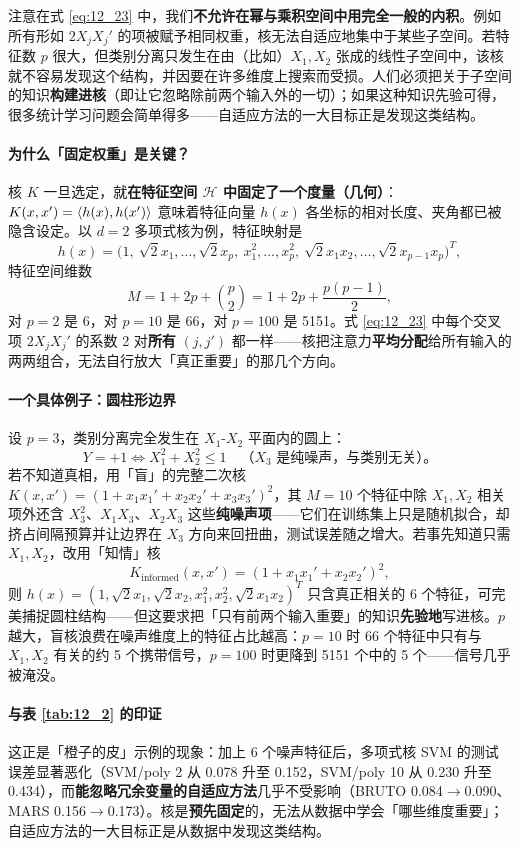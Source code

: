 \begin{remark}[核不能自适应地集中于子空间]
注意在式 \ref{eq:12_23} 中，我们\textbf{不允许在幂与乘积空间中用完全一般的内积}。例如所有形如 $2X_j X_j'$ 的项被赋予相同权重，核无法自适应地集中于某些子空间。若特征数 $p$ 很大，但类别分离只发生在由（比如）$X_1,X_2$ 张成的线性子空间中，该核就不容易发现这个结构，并因要在许多维度上搜索而受损。人们必须把关于子空间的知识\textbf{构建进核}（即让它忽略除前两个输入外的一切）；如果这种知识先验可得，很多统计学习问题会简单得多——自适应方法的一大目标正是发现这类结构。

\paragraph{为什么「固定权重」是关键？}

核 $K$ 一旦选定，就\textbf{在特征空间 $\mathcal{H}$ 中固定了一个度量（几何）}：$K(x,x')=\langle h(x),h(x')\rangle$ 意味着特征向量 $h(x)$ 各坐标的相对长度、夹角都已被隐含设定。以 $d=2$ 多项式核为例，特征映射是
\[
h(x) = \bigl(1,\ \sqrt{2}x_1,\dots,\sqrt{2}x_p,\ x_1^2,\dots,x_p^2,\ \sqrt{2}x_1x_2,\dots,\sqrt{2}x_{p-1}x_p\bigr)^T,
\]
特征空间维数
\[
M = 1 + 2p + \binom{p}{2} = 1 + 2p + \frac{p(p-1)}{2},
\]
对 $p=2$ 是 6，对 $p=10$ 是 66，对 $p=100$ 是 5151。式 \ref{eq:12_23} 中每个交叉项 $2X_j X_j'$ 的系数 2 对\textbf{所有} $(j,j')$ 都一样——核把注意力\textbf{平均分配}给所有输入的两两组合，无法自行放大「真正重要」的那几个方向。

\paragraph{一个具体例子：圆柱形边界}

设 $p=3$，类别分离完全发生在 $X_1$-$X_2$ 平面内的圆上：
\[
Y=+1 \iff X_1^2 + X_2^2 \le 1 \quad\text{（$X_3$ 是纯噪声，与类别无关）。}
\]
若不知道真相，用「盲」的完整二次核 $K(x,x')=(1+x_1x_1'+x_2x_2'+x_3x_3')^2$，其 $M=10$ 个特征中除 $X_1,X_2$ 相关项外还含 $X_3^2$、$X_1X_3$、$X_2X_3$ 这些\textbf{纯噪声项}——它们在训练集上只是随机拟合，却挤占间隔预算并让边界在 $X_3$ 方向来回扭曲，测试误差随之增大。若事先知道只需 $X_1,X_2$，改用「知情」核
\[
K_{\text{informed}}(x,x') = (1 + x_1x_1' + x_2x_2')^2,
\]
则 $h(x)=(1,\sqrt{2}x_1,\sqrt{2}x_2,x_1^2,x_2^2,\sqrt{2}x_1x_2)^T$ 只含真正相关的 6 个特征，可完美捕捉圆柱结构——但这要求把「只有前两个输入重要」的知识\textbf{先验地}写进核。$p$ 越大，盲核浪费在噪声维度上的特征占比越高：$p=10$ 时 66 个特征中只有与 $X_1,X_2$ 有关的约 5 个携带信号，$p=100$ 时更降到 5151 个中的 5 个——信号几乎被淹没。

\paragraph{与表 \ref{tab:12_2} 的印证}

这正是「橙子的皮」示例的现象：加上 6 个噪声特征后，多项式核 SVM 的测试误差显著恶化（SVM/poly 2 从 0.078 升至 0.152，SVM/poly 10 从 0.230 升至 0.434），而\textbf{能忽略冗余变量的自适应方法}几乎不受影响（BRUTO 0.084$\to$0.090、MARS 0.156$\to$0.173）。核是\textbf{预先固定}的，无法从数据中学会「哪些维度重要」；自适应方法的一大目标正是从数据中发现这类结构。
\end{remark}

